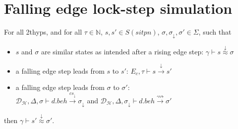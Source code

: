 \documentclass[dvipsnames,12pt]{article}
\begin{document}
\section{Falling edge lock-step simulation}
\label{sec:fe-lock-step}

\begin{lemma}
  \label{lem:fe-lock-step}
  For all \hm2thyps{}, and for all $\tau\in\mathbb{N}$,
  $s,s'\in{}S(sitpn)$, $\sigma,\sigma_\downarrow,\sigma'\in\Sigma$,
  such that
  \begin{itemize}
  \item $s$ and $\sigma$ are similar states as intended after a rising
    edge step: $\gamma\vdash{}s\stackrel{\downarrow}{\approx}\sigma$
  \item a falling edge step leads from $s$ to $s'$:
    $E_c,\tau\vdash{}s\xrightarrow{\downarrow}s'$
  \item a falling edge step leads from $\sigma$ to $\sigma'$:\\
    $\mathcal{D}_\mathcal{H},\Delta,\sigma\vdash{}d.beh\xrightarrow{cs_{\downarrow}}\sigma_{\downarrow}$
    and
    $\mathcal{D}_\mathcal{H},\Delta,\sigma_{\downarrow}\vdash{}d.beh\xrightarrow{\rightsquigarrow}\sigma'$
  \end{itemize}
  then $\gamma\vdash{}s'\stackrel{\downarrow}{\approx}{}\sigma'$.
\end{lemma}
\end{document}
